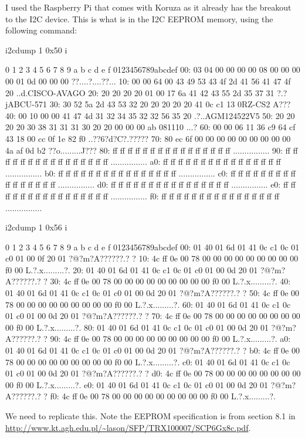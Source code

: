 I used the Raspberry Pi that comes with Koruza as it already has the breakout
to the I2C device. This is what is in the I2C EEPROM memory, using the
following command:

	i2cdump 1 0x50 i

     0  1  2  3  4  5  6  7  8  9  a  b  c  d  e  f    0123456789abcdef
00: 03 04 00 00 00 00 08 00 00 00 00 01 0d 00 00 00    ??....?....??...
10: 00 00 64 00 43 49 53 43 4f 2d 41 56 41 47 4f 20    ..d.CISCO-AVAGO 
20: 20 20 20 20 01 00 17 6a 41 42 43 55 2d 35 37 31        ?.?jABCU-571
30: 30 52 5a 2d 43 53 32 20 20 20 20 20 41 0c c1 13    0RZ-CS2     A???
40: 00 10 00 00 41 47 4d 31 32 34 35 32 32 56 35 20    .?..AGM124522V5 
50: 20 20 20 20 30 38 31 31 31 30 20 20 00 00 00 ab        081110  ...?
60: 00 00 06 11 36 c9 64 cf 43 18 00 cc 0f 1e 82 f0    ..??6?d?C?.?????
70: 80 ec 6f 00 00 00 00 00 00 00 00 00 4a af 0d b2    ??o.........J???
80: ff ff ff ff ff ff ff ff ff ff ff ff ff ff ff ff    ................
90: ff ff ff ff ff ff ff ff ff ff ff ff ff ff ff ff    ................
a0: ff ff ff ff ff ff ff ff ff ff ff ff ff ff ff ff    ................
b0: ff ff ff ff ff ff ff ff ff ff ff ff ff ff ff ff    ................
c0: ff ff ff ff ff ff ff ff ff ff ff ff ff ff ff ff    ................
d0: ff ff ff ff ff ff ff ff ff ff ff ff ff ff ff ff    ................
e0: ff ff ff ff ff ff ff ff ff ff ff ff ff ff ff ff    ................
f0: ff ff ff ff ff ff ff ff ff ff ff ff ff ff ff ff    ................

	i2cdump 1 0x56 i

     0  1  2  3  4  5  6  7  8  9  a  b  c  d  e  f    0123456789abcdef
00: 01 40 01 6d 01 41 0c c1 0c 01 c0 01 00 0f 20 01    ?@?m?A??????.? ?
10: 4c ff 0e 00 78 00 00 00 00 00 00 00 00 00 f0 00    L.?.x.........?.
20: 01 40 01 6d 01 41 0c c1 0c 01 c0 01 00 0d 20 01    ?@?m?A??????.? ?
30: 4c ff 0e 00 78 00 00 00 00 00 00 00 00 00 f0 00    L.?.x.........?.
40: 01 40 01 6d 01 41 0c c1 0c 01 c0 01 00 0d 20 01    ?@?m?A??????.? ?
50: 4c ff 0e 00 78 00 00 00 00 00 00 00 00 00 f0 00    L.?.x.........?.
60: 01 40 01 6d 01 41 0c c1 0c 01 c0 01 00 0d 20 01    ?@?m?A??????.? ?
70: 4c ff 0e 00 78 00 00 00 00 00 00 00 00 00 f0 00    L.?.x.........?.
80: 01 40 01 6d 01 41 0c c1 0c 01 c0 01 00 0d 20 01    ?@?m?A??????.? ?
90: 4c ff 0e 00 78 00 00 00 00 00 00 00 00 00 f0 00    L.?.x.........?.
a0: 01 40 01 6d 01 41 0c c1 0c 01 c0 01 00 0d 20 01    ?@?m?A??????.? ?
b0: 4c ff 0e 00 78 00 00 00 00 00 00 00 00 00 f0 00    L.?.x.........?.
c0: 01 40 01 6d 01 41 0c c1 0c 01 c0 01 00 0d 20 01    ?@?m?A??????.? ?
d0: 4c ff 0e 00 78 00 00 00 00 00 00 00 00 00 f0 00    L.?.x.........?.
e0: 01 40 01 6d 01 41 0c c1 0c 01 c0 01 00 0d 20 01    ?@?m?A??????.? ?
f0: 4c ff 0e 00 78 00 00 00 00 00 00 00 00 00 f0 00    L.?.x.........?.

We need to replicate this. Note the EEPROM specification is from section 8.1
in \url{http://www.kt.agh.edu.pl/~lason/SFP/TRX100007/SCP6Gx8c.pdf}.
